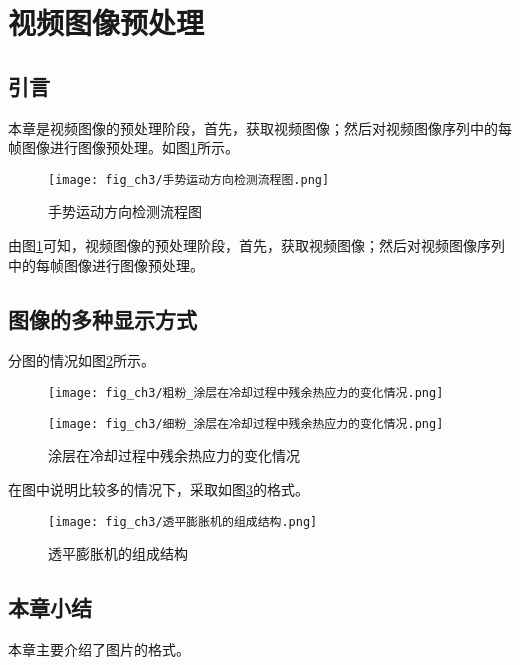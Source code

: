 \section{视频图像预处理}

\subsection{引言}

本章是视频图像的预处理阶段，首先，获取视频图像；然后对视频图像序列中的每帧图像进行图像预处理。如图\ref{fig:手势运动方向检测流程图}所示。
\begin{figure}[H]
  \centering
  \texttt{[image: fig\_ch3/手势运动方向检测流程图.png]}
  \caption{手势运动方向检测流程图}
  \label{fig:手势运动方向检测流程图}
\end{figure}

由图\ref{fig:手势运动方向检测流程图}可知，视频图像的预处理阶段，首先，获取视频图像；然后对视频图像序列中的每帧图像进行图像预处理。

\subsection{图像的多种显示方式}

分图的情况如图\ref{fig:涂层在冷却过程中残余热应力的变化情况}所示。
\begin{figure}[H]
    \centering
    \begin{minipage}[c]{0.48\textwidth}
        \centering
        \texttt{[image: fig\_ch3/粗粉\_涂层在冷却过程中残余热应力的变化情况.png]}
    \end{minipage}
    \begin{minipage}[c]{0.48\textwidth}
        \centering
        \texttt{[image: fig\_ch3/细粉\_涂层在冷却过程中残余热应力的变化情况.png]}
    \end{minipage}
    \caption{涂层在冷却过程中残余热应力的变化情况}\label{fig:涂层在冷却过程中残余热应力的变化情况}
\end{figure}

在图中说明比较多的情况下，采取如图\ref{fig:透平膨胀机的组成结构}的格式。
\begin{figure}[H]
  \centering
  \texttt{[image: fig\_ch3/透平膨胀机的组成结构.png]}
  \caption{透平膨胀机的组成结构}
  \label{fig:透平膨胀机的组成结构}
\end{figure}

\subsection{本章小结}

本章主要介绍了图片的格式。

